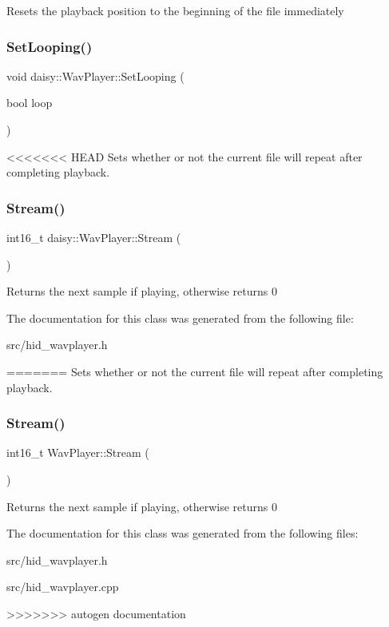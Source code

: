 Resets the playback position to the beginning of the file immediately \mbox{\label{classdaisy_1_1_wav_player_a29d340360f073bd1767e51a06876eafe}} 
\subsubsection{\texorpdfstring{Set\+Looping()}{SetLooping()}}
{\footnotesize\ttfamily void daisy\+::\+Wav\+Player\+::\+Set\+Looping (\begin{DoxyParamCaption}\item[{bool}]{loop }\end{DoxyParamCaption})\hspace{0.3cm}{\ttfamily [inline]}}

<<<<<<< HEAD
Sets whether or not the current file will repeat after completing playback. \mbox{\label{classdaisy_1_1_wav_player_a52be0ed680b908241ffc287f879c6c7a}} 
\subsubsection{\texorpdfstring{Stream()}{Stream()}}
{\footnotesize\ttfamily int16\+\_\+t daisy\+::\+Wav\+Player\+::\+Stream (\begin{DoxyParamCaption}{ }\end{DoxyParamCaption})}

Returns the next sample if playing, otherwise returns 0 

The documentation for this class was generated from the following file\+:\begin{DoxyCompactItemize}
\item 
src/hid\+\_\+wavplayer.\+h\end{DoxyCompactItemize}
=======
Sets whether or not the current file will repeat after completing playback. \mbox{\label{classdaisy_1_1_wav_player_ad0287f6c4be39aead3f7061c0c2b9174}} 
\subsubsection{\texorpdfstring{Stream()}{Stream()}}
{\footnotesize\ttfamily int16\+\_\+t Wav\+Player\+::\+Stream (\begin{DoxyParamCaption}{ }\end{DoxyParamCaption})}

Returns the next sample if playing, otherwise returns 0 

The documentation for this class was generated from the following files\+:\begin{DoxyCompactItemize}
\item 
src/hid\+\_\+wavplayer.\+h\item 
src/hid\+\_\+wavplayer.\+cpp\end{DoxyCompactItemize}
>>>>>>> autogen documentation
